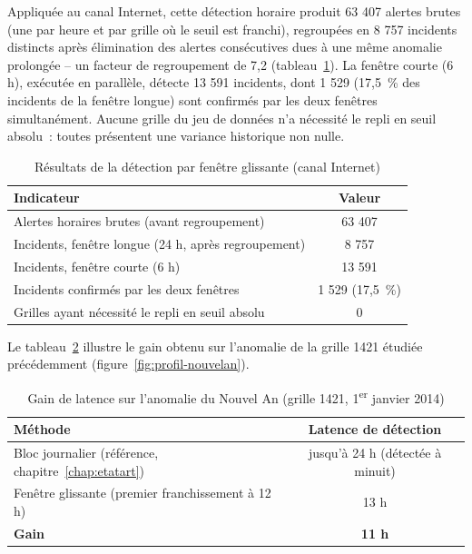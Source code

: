 Appliquée au canal Internet, cette détection horaire produit
63 407 alertes brutes (une par heure et par grille où le seuil est
franchi), regroupées en 8 757 incidents distincts après élimination
des alertes consécutives dues à une même anomalie prolongée -- un
facteur de regroupement de 7,2 (tableau~\ref{tab:sliding-results}).
La fenêtre courte (6 h), exécutée en parallèle, détecte 13 591
incidents, dont 1 529 (17,5~\% des incidents de la fenêtre longue)
sont confirmés par les deux fenêtres simultanément. Aucune grille du
jeu de données n'a nécessité le repli en seuil absolu~: toutes
présentent une variance historique non nulle.

\begin{table}[htbp]
  \centering
  \caption{Résultats de la détection par fenêtre glissante (canal Internet)}
  \label{tab:sliding-results}
  \begin{tabular}{lc}
    \toprule
    \textbf{Indicateur} & \textbf{Valeur} \\
    \midrule
    Alertes horaires brutes (avant regroupement) & 63 407 \\
    Incidents, fenêtre longue (24 h, après regroupement) & 8 757 \\
    Incidents, fenêtre courte (6 h) & 13 591 \\
    Incidents confirmés par les deux fenêtres & 1 529 (17,5~\%) \\
    Grilles ayant nécessité le repli en seuil absolu & 0 \\
    \bottomrule
  \end{tabular}
\end{table}

Le tableau~\ref{tab:latence} illustre le gain obtenu sur l'anomalie de
la grille 1421 étudiée précédemment (figure~\ref{fig:profil-nouvelan}).

\begin{table}[htbp]
  \centering
  \caption{Gain de latence sur l'anomalie du Nouvel An (grille 1421, 1\textsuperscript{er} janvier 2014)}
  \label{tab:latence}
  \begin{tabular}{lc}
    \toprule
    \textbf{Méthode} & \textbf{Latence de détection} \\
    \midrule
    Bloc journalier (référence, chapitre~\ref{chap:etatart}) & jusqu'à 24 h (détectée à minuit) \\
    Fenêtre glissante (premier franchissement à 12 h) & 13 h \\
    \midrule
    \textbf{Gain} & \textbf{11 h} \\
    \bottomrule
  \end{tabular}
\end{table}

